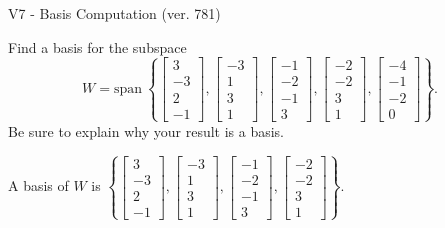 \begin{exercise}
  \begin{exerciseTitle}V7 - Basis Computation (ver. 781)\end{exerciseTitle}
  \begin{exerciseStatement}
    Find a basis for the subspace 
\[W=\mathrm{span}\ \left\{\left[\begin{array}{r}
3 \\
-3 \\
2 \\
-1
\end{array}\right] , \left[\begin{array}{r}
-3 \\
1 \\
3 \\
1
\end{array}\right] , \left[\begin{array}{r}
-1 \\
-2 \\
-1 \\
3
\end{array}\right] , \left[\begin{array}{r}
-2 \\
-2 \\
3 \\
1
\end{array}\right] , \left[\begin{array}{r}
-4 \\
-1 \\
-2 \\
0
\end{array}\right]\right\}.\]
 Be sure to explain why your result is a basis.


  \end{exerciseStatement}
  \begin{exerciseAnswer}
   A basis of \(W\) is  \(\left\{\left[\begin{array}{r}
3 \\
-3 \\
2 \\
-1
\end{array}\right] , \left[\begin{array}{r}
-3 \\
1 \\
3 \\
1
\end{array}\right] , \left[\begin{array}{r}
-1 \\
-2 \\
-1 \\
3
\end{array}\right] , \left[\begin{array}{r}
-2 \\
-2 \\
3 \\
1
\end{array}\right]\right\}\).
  


  \end{exerciseAnswer}
\end{exercise}